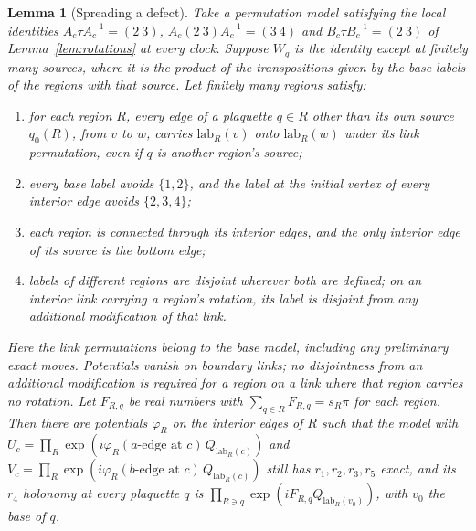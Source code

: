 \documentclass[11pt,a4paper]{article}
\theoremstyle{plain}
\newtheorem{lemma}[theorem]{Lemma}
\theoremstyle{definition}
\theoremstyle{remark}
\begin{document}
\begin{lemma}[Spreading a defect]\label{lem:spreading}
Take a permutation model satisfying the local identities
$A_c\tau A_c^{-1}=(2\ 3)$, $A_c(2\ 3)A_c^{-1}=(3\ 4)$ and $B_c\tau B_c^{-1}=(2\ 3)$ of Lemma~\ref{lem:rotations} at every clock.
Suppose $W_q$ is the identity except at finitely many sources, where it is the
product of the transpositions given by the base labels of the regions with that source. Let finitely many regions satisfy:
\begin{enumerate}[label=(R\arabic*),itemsep=0pt]
\item for each region $R$, every edge of a plaquette $q\in R$ other than its own source $q_0(R)$, from $v$ to $w$, carries $\mathrm{lab}_R(v)$ onto $\mathrm{lab}_R(w)$ under its link permutation, even if $q$ is another region's source;
\item every base label avoids $\{1,2\}$, and the label at the initial vertex of every interior edge avoids $\{2,3,4\}$;
\item each region is connected through its interior edges, and the only interior edge of its source is the bottom edge;
\item labels of different regions are disjoint wherever both are defined; on an interior link carrying a region's rotation, its label is disjoint from any additional modification of that link.
\end{enumerate}
Here the link permutations belong to the base model, including any preliminary exact moves. Potentials vanish on boundary links;
no disjointness from an additional modification is required for a region on a link where that region carries no rotation.
Let $F_{R,q}$ be real numbers with $\sum_{q\in R}F_{R,q}=s_R\pi$ for each region. Then there are potentials $\varphi_R$ on the interior
edges of $R$ such that the model with $U_c=\prod_R\exp(i\varphi_R(\text{$a$-edge at }c)\,Q_{\mathrm{lab}_R(c)})$ and
$V_c=\prod_R\exp(i\varphi_R(\text{$b$-edge at }c)\,Q_{\mathrm{lab}_R(c)})$ still has $r_1,r_2,r_3,r_5$ exact, and its $r_4$ holonomy at
every plaquette $q$ is $\prod_{R\ni q}\exp(iF_{R,q}Q_{\mathrm{lab}_R(v_0)})$, with $v_0$ the base of $q$.
\end{lemma}
\end{document}
